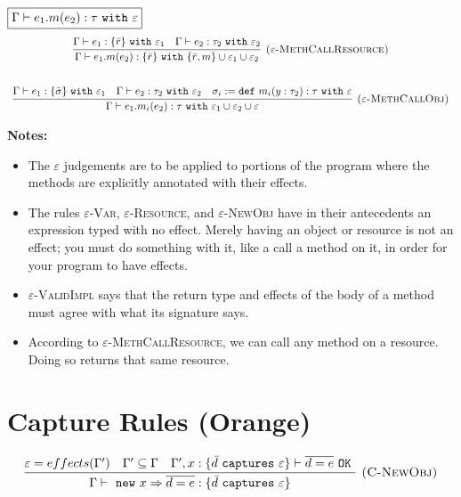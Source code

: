 \documentclass{llncs}
\newcommand{\keywadj}[1]{\mathtt{#1}}
\newcommand{\keyw}[1]{\keywadj{#1}~}
\begin{document}
$\fbox{$\Gamma \vdash e_1.m(e_2) : \tau~\keyw{with} \varepsilon$}$
\[
\begin{array}{c}
\infer[\textsc{($\varepsilon$-MethCallResource)}]
	{\Gamma \vdash e_1.m(e_2) : \{ \bar r \}~\keyw{with} \{ \bar r, m\} \cup \varepsilon_1 \cup \varepsilon_2}
	{\Gamma \vdash e_1 : \{ \bar r \}~ \keyw{with} \varepsilon_1 & \Gamma \vdash e_2:\tau_2~\keyw{with} \varepsilon_2} \\[5ex]
	
\infer[\textsc{($\varepsilon$-MethCallObj)}]
	{\Gamma \vdash e_1.m_i(e_2):\tau~\keyw{with} \varepsilon_1 \cup \varepsilon_2 \cup \varepsilon}
	{\Gamma \vdash e_1 : \{ \bar \sigma \}~\keyw{with} \varepsilon_1 & \Gamma \vdash e_2 : \tau_2~\keyw{with} \varepsilon_2 & \sigma_i := \keyw{def} m_i(y:\tau_2):\tau~\keyw{with} \varepsilon}

\end{array}
\]

\noindent \textbf{Notes:}

\begin{itemize}
	\item The $\varepsilon$ judgements are to be applied to portions of the program where the methods are explicitly annotated with their effects.
	\item The rules \textsc{$\varepsilon$-Var}, \textsc{$\varepsilon$-Resource}, and \textsc{$\varepsilon$-NewObj} have in their antecedents an expression typed with no effect. Merely having an object or resource is not an effect; you must do something with it, like a call a method on it, in order for your program to have effects.
	\item \textsc{$\varepsilon$-ValidImpl} says that the return type and effects of the body of a method must agree with what its signature says.
	\item According to \textsc{$\varepsilon$-MethCallResource}, we can call any method on a resource. Doing so returns that same resource.
\end{itemize}


\section{Capture Rules (Orange)}


\fbox{$\Gamma e : \{ \bar d~\keyw{captures} \varepsilon\}$}

\[
\begin{array}{c}
\infer[\textsc{(C-NewObj)}]
	{\Gamma \vdash~\keywadj{new}~x \Rightarrow \overline{d = e} : \{  \bar d~\keyw{captures} \varepsilon \} }
	{\varepsilon = effects(\Gamma') & \Gamma' \subseteq \Gamma & \Gamma', x : \{ \bar d~\keyw {captures} \varepsilon \} \vdash \overline{d = e}~\keyw{OK}} \\[5ex]
\end{array}
\]
\end{document}

